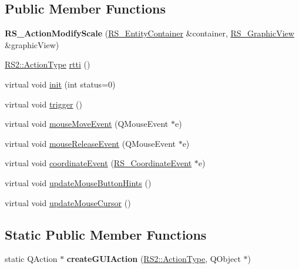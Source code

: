 \subsection*{Public Member Functions}
\begin{DoxyCompactItemize}
\item 
\hypertarget{classRS__ActionModifyScale_ab7905142a21f8602edaa998c08d69602}{{\bfseries R\-S\-\_\-\-Action\-Modify\-Scale} (\hyperlink{classRS__EntityContainer}{R\-S\-\_\-\-Entity\-Container} \&container, \hyperlink{classRS__GraphicView}{R\-S\-\_\-\-Graphic\-View} \&graphic\-View)}\label{classRS__ActionModifyScale_ab7905142a21f8602edaa998c08d69602}

\item 
\hyperlink{classRS2_afe3523e0bc41fd637b892321cfc4b9d7}{R\-S2\-::\-Action\-Type} \hyperlink{classRS__ActionModifyScale_a86ed09edd9eda3b781d357d5c2b791a5}{rtti} ()
\item 
virtual void \hyperlink{classRS__ActionModifyScale_ab90b82cf252efdd4432f93c7b5f55e7a}{init} (int status=0)
\item 
virtual void \hyperlink{classRS__ActionModifyScale_abec9cf60288e4cd8fa328f22d127e4d9}{trigger} ()
\item 
virtual void \hyperlink{classRS__ActionModifyScale_a5dff49df8cd17c81788aec714ef89d7b}{mouse\-Move\-Event} (Q\-Mouse\-Event $\ast$e)
\item 
virtual void \hyperlink{classRS__ActionModifyScale_ac5295ba6ecebc3752c15507723685dfd}{mouse\-Release\-Event} (Q\-Mouse\-Event $\ast$e)
\item 
virtual void \hyperlink{classRS__ActionModifyScale_a935b0fb918f9fe1d6107de64c84e53ef}{coordinate\-Event} (\hyperlink{classRS__CoordinateEvent}{R\-S\-\_\-\-Coordinate\-Event} $\ast$e)
\item 
virtual void \hyperlink{classRS__ActionModifyScale_a7e5363f6a5a7929e3b9feb562c4b59a5}{update\-Mouse\-Button\-Hints} ()
\item 
virtual void \hyperlink{classRS__ActionModifyScale_ae794f89be4fd2cb51477ab88ea9b1bee}{update\-Mouse\-Cursor} ()
\end{DoxyCompactItemize}
\subsection*{Static Public Member Functions}
\begin{DoxyCompactItemize}
\item 
\hypertarget{classRS__ActionModifyScale_aec70dc685dc25ef0e1e730426a29915b}{static Q\-Action $\ast$ {\bfseries create\-G\-U\-I\-Action} (\hyperlink{classRS2_afe3523e0bc41fd637b892321cfc4b9d7}{R\-S2\-::\-Action\-Type}, Q\-Object $\ast$)}\label{classRS__ActionModifyScale_aec70dc685dc25ef0e1e730426a29915b}

\end{DoxyCompactItemize}
